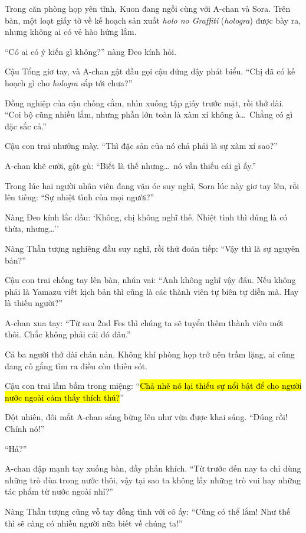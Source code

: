 \documentclass[../main.tex]{subfiles}
\begin{document}
Trong căn phòng họp yên tĩnh, Kuon đang ngồi cùng với A-chan và Sora. Trên bàn, một loạt giấy tờ về kế hoạch sản xuất \textit{holo no Graffiti} (\textit{hologra}) được bày ra, nhưng không ai có vẻ hào hứng lắm.

``Có ai có ý kiến gì không?'' nàng Đeo kính hỏi.

Cậu Tổng giơ tay, và A-chan gật đầu gọi cậu đứng dậy phát biểu. ``Chị đã có kế hoạch gì cho \textit{hologra} sắp tới chưa?''

Đồng nghiệp của cậu chống cằm, nhìn xuống tập giấy trước mặt, rồi thở dài. ``Coi bộ cũng nhiều lắm, nhưng phần lớn toàn là xàm xí không à\dots\ Chẳng có gì đặc sắc cả.''

Cậu con trai nhướng mày. ``Thì đặc sản của nó chả phải là sự xàm xí sao?''

A-chan khẽ cười, gật gù: ``Biết là thế nhưng\dots\ nó vẫn thiếu cái gì ấy.''

Trong lúc hai người nhân viên đang vặn óc suy nghĩ, Sora lúc này giơ tay lên, rồi lên tiếng: ``Sự nhiệt tình của mọi người?''

Nàng Đeo kính lắc đầu: `Không, chị không nghĩ thế. Nhiệt tình thì đúng là có thừa, nhưng\dots''

Nàng Thần tượng nghiêng đầu suy nghĩ, rồi thử đoán tiếp: ``Vậy thì là sự nguyên bản?''

Cậu con trai chống tay lên bàn, nhún vai: ``Anh không nghĩ vậy đâu. Nếu không phải là Yamazu viết kịch bản thì cũng là các thành viên tự biên tự diễn mà. Hay là thiếu người?''

A-chan xua tay: ``Từ sau 2nd Fes thì chúng ta sẽ tuyển thêm thành viên mới thôi. Chắc không phải cái đó đâu.''

Cả ba người thở dài chán nản. Không khí phòng họp trở nên trầm lặng, ai cũng đang cố gắng tìm ra điều còn thiếu sót.

Cậu con trai lầm bầm trong miệng: ``\hl{Chả nhẽ nó lại thiếu sự nổi bật để cho người nước ngoài cảm thấy thích thú?}''

Đột nhiên, đôi mắt A-chan sáng bừng lên như vừa được khai sáng. ``Đúng rồi! Chính nó!''

``Hả?''

A-chan đập mạnh tay xuống bàn, đầy phấn khích. ``Từ trước đến nay ta chỉ dùng những trò đùa trong nước thôi, vậy tại sao ta không lấy những trò vui hay những tác phẩm từ nước ngoài nhỉ?''

Nàng Thần tượng cũng vỗ tay đồng tình với cô ấy: ``Cũng có thể lắm! Như thế thì sẽ càng có nhiều người nữa biết về chúng ta!''
\end{document}
